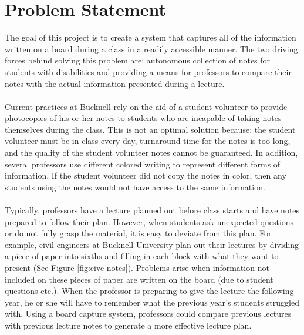 \documentclass{article}
\begin{document}
	\section{Problem Statement}
		The goal of this project is to create a system that captures all of the information written on a board during a class in a readily accessible manner. The two driving forces behind solving this problem are: autonomous collection of notes for students with disabilities and providing a means for professors to compare their notes with the actual information presented during a lecture.\\
		\\
		Current practices at Bucknell rely on the aid of a student volunteer to provide photocopies of his or her notes to students who are incapable of taking notes themselves during the class. This is not an optimal solution because: the student volunteer must be in class every day, turnaround time for the notes is too long, and the quality of the student volunteer notes cannot be guaranteed. In addition, several professors use different colored writing to represent different forms of information. If the student volunteer did not copy the notes in color, then any students using the notes would not have access to the same information.\\
		\\
		Typically, professors have a lecture planned out before class starts and have notes prepared to follow their plan. However, when students ask unexpected questions or do not fully grasp the material, it is easy to deviate from this plan. For example, civil engineers at Bucknell University plan out their lectures by dividing a piece of paper into sixths and filling in each block with what they want to present (See Figure \ref{fig:cive-notes}). Problems arise when information not included on these pieces of paper are written on the board (due to student questions etc.). When the professor is preparing to give the lecture the following year, he or she will have to remember what the previous year's students struggled with. Using a board capture system, professors could compare previous lectures with previous lecture notes to generate a more effective lecture plan. 
		
\end{document}
